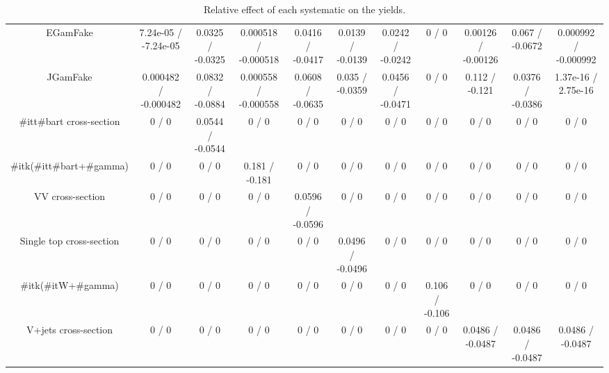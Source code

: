 \begin{table}[htbp]
\begin{center}
\begin{tabular}{|c|c|c|c|c|c|c|c|c|c|c|}
  EGamFake & 7.24e-05 / -7.24e-05 & 0.0325 / -0.0325 & 0.000518 / -0.000518 & 0.0416 / -0.0417 & 0.0139 / -0.0139 & 0.0242 / -0.0242 & 0 / 0 & 0.00126 / -0.00126 & 0.067 / -0.0672 & 0.000992 / -0.000992 \\ 
  JGamFake & 0.000482 / -0.000482 & 0.0832 / -0.0884 & 0.000558 / -0.000558 & 0.0608 / -0.0635 & 0.035 / -0.0359 & 0.0456 / -0.0471 & 0 / 0 & 0.112 / -0.121 & 0.0376 / -0.0386 & 1.37e-16 / 2.75e-16 \\ 
  #it{t#bar{t}} cross-section & 0 / 0 & 0.0544 / -0.0544 & 0 / 0 & 0 / 0 & 0 / 0 & 0 / 0 & 0 / 0 & 0 / 0 & 0 / 0 & 0 / 0 \\ 
  #it{k}(#it{t#bar{t}+#gamma}) & 0 / 0 & 0 / 0 & 0.181 / -0.181 & 0 / 0 & 0 / 0 & 0 / 0 & 0 / 0 & 0 / 0 & 0 / 0 & 0 / 0 \\ 
  VV cross-section & 0 / 0 & 0 / 0 & 0 / 0 & 0.0596 / -0.0596 & 0 / 0 & 0 / 0 & 0 / 0 & 0 / 0 & 0 / 0 & 0 / 0 \\ 
  Single top cross-section & 0 / 0 & 0 / 0 & 0 / 0 & 0 / 0 & 0.0496 / -0.0496 & 0 / 0 & 0 / 0 & 0 / 0 & 0 / 0 & 0 / 0 \\ 
  #it{k}(#it{W+#gamma}) & 0 / 0 & 0 / 0 & 0 / 0 & 0 / 0 & 0 / 0 & 0 / 0 & 0.106 / -0.106 & 0 / 0 & 0 / 0 & 0 / 0 \\ 
  V+jets cross-section & 0 / 0 & 0 / 0 & 0 / 0 & 0 / 0 & 0 / 0 & 0 / 0 & 0 / 0 & 0.0486 / -0.0487 & 0.0486 / -0.0487 & 0.0486 / -0.0487 \\ 
\hline 
\end{tabular} 
\caption{Relative effect of each systematic on the yields.} 
\end{center} 
\end{table} 
